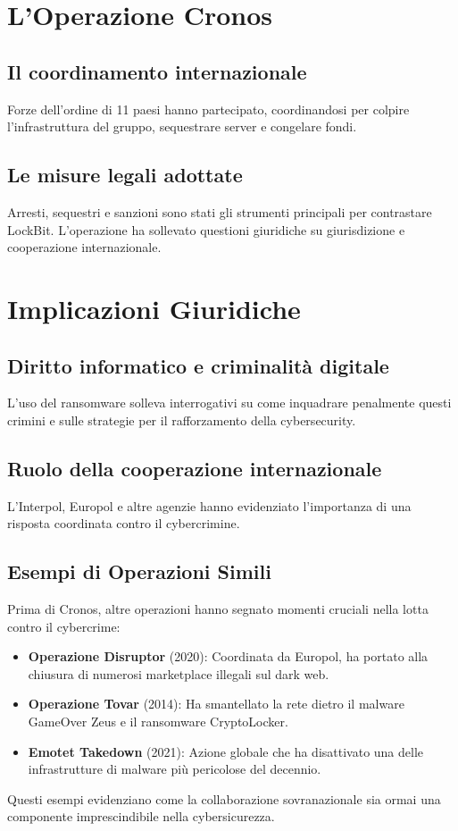 \documentclass[a4paper,12pt]{article}
\begin{document}
\section{L'Operazione Cronos}
\subsection{Il coordinamento internazionale}
Forze dell'ordine di 11 paesi hanno partecipato, coordinandosi per colpire l'infrastruttura del gruppo, sequestrare server e congelare fondi.

\subsection{Le misure legali adottate}
Arresti, sequestri e sanzioni sono stati gli strumenti principali per contrastare LockBit. L'operazione ha sollevato questioni giuridiche su giurisdizione e cooperazione internazionale.

\section{Implicazioni Giuridiche}
\subsection{Diritto informatico e criminalità digitale}
L'uso del ransomware solleva interrogativi su come inquadrare penalmente questi crimini e sulle strategie per il rafforzamento della cybersecurity.

\subsection{Ruolo della cooperazione internazionale}
L'Interpol, Europol e altre agenzie hanno evidenziato l'importanza di una risposta coordinata contro il cybercrimine.

\subsection{Esempi di Operazioni Simili}
Prima di Cronos, altre operazioni hanno segnato momenti cruciali nella lotta contro il cybercrime:
\begin{itemize}
    \item \textbf{Operazione Disruptor} (2020): Coordinata da Europol, ha portato alla chiusura di numerosi marketplace illegali sul dark web.
    \item \textbf{Operazione Tovar} (2014): Ha smantellato la rete dietro il malware GameOver Zeus e il ransomware CryptoLocker.
    \item \textbf{Emotet Takedown} (2021): Azione globale che ha disattivato una delle infrastrutture di malware più pericolose del decennio.
\end{itemize}
Questi esempi evidenziano come la collaborazione sovranazionale sia ormai una componente imprescindibile nella cybersicurezza.
\end{document}
